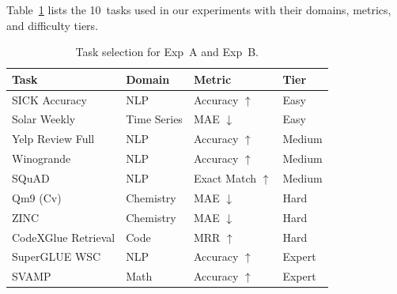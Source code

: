 \documentclass{article} %
\begin{document}
Table~\ref{tab:tasks} lists the 10~tasks used in our experiments with their
domains, metrics, and difficulty tiers.

\begin{table}[ht]
\centering
\caption{Task selection for Exp~A and Exp~B.}
\label{tab:tasks}
\small
\begin{tabular}{@{}llll@{}}
\toprule
\textbf{Task} & \textbf{Domain} & \textbf{Metric} & \textbf{Tier} \\
\midrule
SICK Accuracy           & NLP         & Accuracy $\uparrow$   & Easy \\
Solar Weekly            & Time Series & MAE $\downarrow$      & Easy \\
Yelp Review Full        & NLP         & Accuracy $\uparrow$   & Medium \\
Winogrande              & NLP         & Accuracy $\uparrow$   & Medium \\
SQuAD                   & NLP         & Exact Match $\uparrow$& Medium \\
Qm9 (Cv)               & Chemistry   & MAE $\downarrow$      & Hard \\
ZINC                    & Chemistry   & MAE $\downarrow$      & Hard \\
CodeXGlue Retrieval     & Code        & MRR $\uparrow$        & Hard \\
SuperGLUE WSC           & NLP         & Accuracy $\uparrow$   & Expert \\
SVAMP                   & Math        & Accuracy $\uparrow$   & Expert \\
\bottomrule
\end{tabular}
\end{table}
\end{document}
